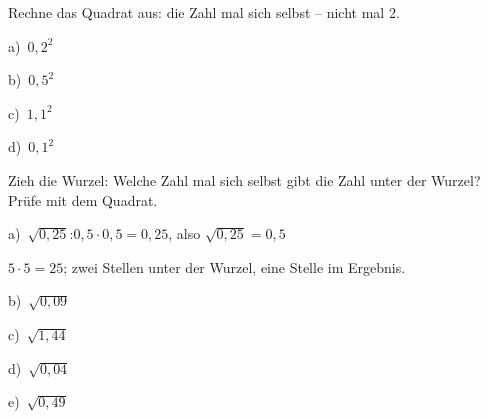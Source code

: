 \documentclass[11pt]{article}
\providecommand{\grau}[1]{{\color{mbgrau}#1}}
\newcommand{\aufg}[3]{\par\noindent\makebox[0pt][r]{#3}\begin{minipage}[t]{\linewidth}#1\end{minipage}\par}
\newcommand{\nr}[1]{\makebox[7mm][l]{\textbf{#1}}}
\begin{document}
\aufg{\nr{1.}\begin{minipage}[t]{\dimexpr\linewidth-7mm\relax}Rechne das Quadrat aus: die Zahl mal sich selbst – nicht mal 2.\par\smallskip
\noindent\begin{minipage}[t]{0.48\linewidth}\raggedright
a)\ $0{,}2^2$
\end{minipage}\hfill
\begin{minipage}[t]{0.48\linewidth}\raggedright
b)\ $0{,}5^2$
\end{minipage}\par\smallskip
\noindent\begin{minipage}[t]{0.48\linewidth}\raggedright
c)\ $1{,}1^2$
\end{minipage}\hfill
\begin{minipage}[t]{0.48\linewidth}\raggedright
d)\ $0{,}1^2$
\end{minipage}\par\smallskip\end{minipage}}{}{}
\medskip
\aufg{\nr{2.}\begin{minipage}[t]{\dimexpr\linewidth-7mm\relax}Zieh die Wurzel: Welche Zahl mal sich selbst gibt die Zahl unter der Wurzel? Prüfe mit dem Quadrat.\par\smallskip
\grau{a)\ $\sqrt{0{,}25}$:\quad $0{,}5 \cdot 0{,}5 = 0{,}25$, also $\sqrt{0{,}25} = 0{,}5$}\par{\small $5 \cdot 5 = 25$; zwei Stellen unter der Wurzel, eine Stelle im Ergebnis.}\par\medskip
\noindent\begin{minipage}[t]{0.48\linewidth}\raggedright
b)\ $\sqrt{0{,}09}$
\end{minipage}\hfill
\begin{minipage}[t]{0.48\linewidth}\raggedright
c)\ $\sqrt{1{,}44}$
\end{minipage}\par\smallskip
\noindent\begin{minipage}[t]{0.48\linewidth}\raggedright
d)\ $\sqrt{0{,}04}$
\end{minipage}\hfill
\begin{minipage}[t]{0.48\linewidth}\raggedright
e)\ $\sqrt{0{,}49}$
\end{minipage}\par\smallskip\end{minipage}}{}{}
\medskip
\end{document}
